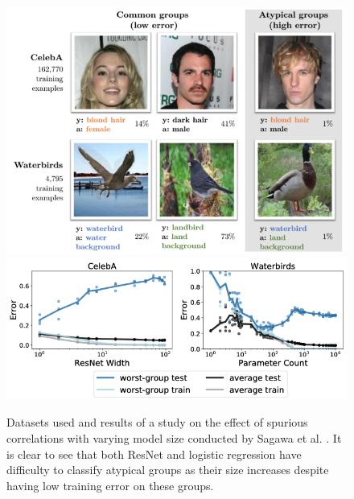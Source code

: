 \documentclass{article}
\begin{document}
\begin{figure}
    \centering
    \includegraphics[scale=0.2]{sagawa_dataset.png}
    \includegraphics[scale=0.28]{sagawa_diagram_standard.png}
    \caption{Datasets used and results of a study on the effect of spurious correlations with varying model size conducted
    by Sagawa et al. \cite{pmlr-v119-sagawa20a}. It is clear to see that both ResNet and logistic regression have
    difficulty to classify atypical groups as their size increases despite having low training error on these groups.}
    \label{fig:sagawaImg}
\end{figure}
\end{document}
